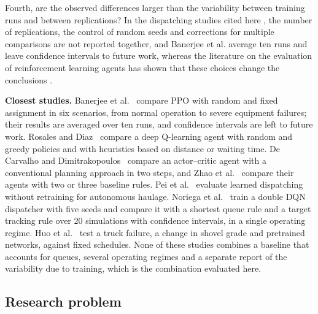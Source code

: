 \documentclass[11pt,a4paper]{article}
\newif\ifrevmarks
\newcommand{\revtag}[1]{\ifrevmarks\textsuperscript{\textcolor{red!70!black}{\scriptsize[#1]}}\fi}
\newenvironment{revbloc}[1]{\par\ifrevmarks\color{revcolor}\noindent\revtag{#1}\ \fi}{\par}
\newif\ifcorrmarks
\newcommand{\corr}[1]{\ifcorrmarks\textcolor{corrcolor}{#1}\else#1\fi}
\newenvironment{corrbloc}{\par\ifcorrmarks\color{corrcolor}\fi}{\par}
\begin{document}
\begin{revbloc}{M24 (merger of §1.3, §2.4, §3)}
\corr{Fourth, are the observed differences larger than the variability between training runs and between replications?} \corr{In the dispatching studies cited here \cite{MehrnazMohtasham2023, MiladAbolghasemian2020, BurakOzdemir2019}, the number of replications, the control of random seeds and corrections for multiple comparisons are not reported together, and Banerjee et al. \cite{Banerjee2025} average ten runs and leave confidence intervals to future work,} whereas the literature on the evaluation of reinforcement learning agents has shown that these choices change the conclusions \cite{Henderson2018, Agarwal2021}.

\begin{corrbloc}
\textbf{Closest studies.} Banerjee et al.~\cite{Banerjee2025} compare PPO with random and fixed assignment in six scenarios, from normal operation to severe equipment failures; their results are averaged over ten runs, and confidence intervals are left to future work. Rosales and Diaz~\cite{FranciscoRosales2025} compare a deep Q-learning agent with random and greedy policies and with heuristics based on distance or waiting time. De Carvalho and Dimitrakopoulos~\cite{deCarvalho2023} compare an actor--critic agent with a conventional planning approach in two steps, and Zhao et al.~\cite{Zhao2025} compare their agents with two or three baseline rules. Pei et al.~\cite{Pei2025} evaluate learned dispatching without retraining for autonomous haulage. \corr{Noriega et al.~\cite{Noriega2025} train a double DQN dispatcher with five seeds and compare it with a shortest queue rule and a target tracking rule over 20 simulations with confidence intervals, in a single operating regime. Huo et al.~\cite{Huo2024} test a truck failure, a change in shovel grade and pretrained networks, against fixed schedules.} None of these studies combines a baseline that accounts for queues, several operating regimes and a separate report of the variability due to training, which is the combination evaluated here.
\end{corrbloc}
\end{revbloc}

\subsection{Research problem}
\label{sec:problem-statement}
\end{document}
